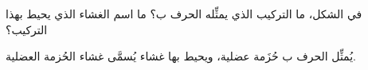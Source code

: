 
\begin{question}

\begin{instance}

\begin{frq}

\begin{stem}
في الشكل، ما التركيب الذي يمثِّله الحرف ب؟ ما اسم الغشاء الذي يحيط بهذا التركيب؟\par
{}
\end{stem}

\begin{answer}
يُمثِّل الحرف ب حُزَمة عضلية، ويحيط بها غشاء يُسمَّى غشاء الحُزمة العضلية.\par

\end{answer}

\end{frq}

\end{instance}

\end{question}
